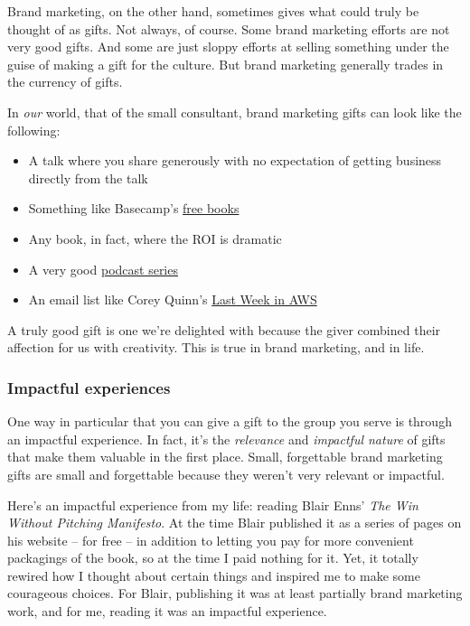 \documentclass[13pt,]{tufte-handout}
\providecommand{\tightlist}{%
  \setlength{\itemsep}{0pt}\setlength{\parskip}{0pt}}
\begin{document}
Brand marketing, on the other hand, sometimes gives what could truly be
thought of as gifts. Not always, of course. Some brand marketing efforts
are not very good gifts. And some are just sloppy efforts at selling
something under the guise of making a gift for the culture. But brand
marketing generally trades in the currency of gifts.

In \emph{our} world, that of the small consultant, brand marketing gifts
can look like the following:

\begin{itemize}
\tightlist
\item
  A talk where you share generously with no expectation of getting
  business directly from the talk
\item
  Something like Basecamp's \href{https://basecamp.com/books}{free
  books}
\item
  Any book, in fact, where the ROI is dramatic
\item
  A very good \href{https://2bobs.com}{podcast series}
\item
  An email list like Corey Quinn's
  \href{https://www.lastweekinaws.com}{Last Week in AWS}
\end{itemize}

A truly good gift is one we're delighted with because the giver combined
their affection for us with creativity. This is true in brand marketing,
and in life.

\hypertarget{impactful-experiences}{%
\subsubsection{Impactful experiences}\label{impactful-experiences}}

One way in particular that you can give a gift to the group you serve is
through an impactful experience. In fact, it's the \emph{relevance} and
\emph{impactful nature} of gifts that make them valuable in the first
place. Small, forgettable brand marketing gifts are small and
forgettable because they weren't very relevant or impactful.

Here's an impactful experience from my life: reading Blair Enns'
\emph{The Win Without Pitching Manifesto}. At the time Blair published
it as a series of pages on his website -- for free -- in addition to
letting you pay for more convenient packagings of the book, so at the
time I paid nothing for it. Yet, it totally rewired how I thought about
certain things and inspired me to make some courageous choices. For
Blair, publishing it was at least partially brand marketing work, and
for me, reading it was an impactful experience.
\end{document}
